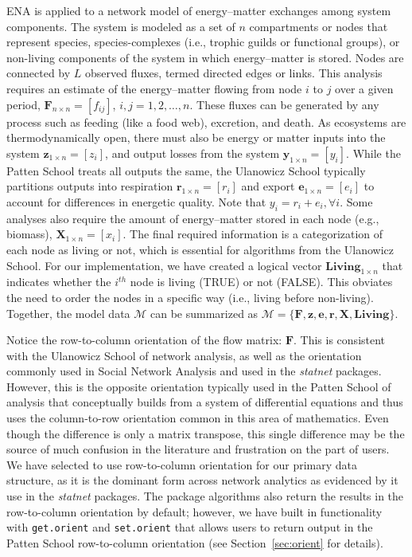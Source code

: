 \documentclass[article]{jss}
\begin{document}
ENA is applied to a network model of energy--matter exchanges among
system components.  The system is modeled as a set of $n$ compartments
or nodes that represent species, species-complexes (i.e., trophic
guilds or functional groups), or non-living components of the system
in which energy--matter is stored.  Nodes are connected by $L$
observed fluxes, termed directed edges or links.  This analysis
requires an estimate of the energy--matter flowing from node $i$ to
$j$ over a given period, $\mathbf{F}_{n\times n}=[f_{ij}]$,
$i,j=1,2,\ldots,n$.  These fluxes can be generated by any process such
as feeding (like a food web), excretion, and death.  As ecosystems are
thermodynamically open, there must also be energy or matter inputs
into the system $\mathbf{z}_{1 \times n}=[z_i]$, and output losses
from the system $\mathbf{y}_{1 \times n}=[y_i]$.  While the Patten
School treats all outputs the same, the Ulanowicz School typically
partitions outputs into respiration $\mathbf{r}_{1\times n}=[r_i]$ and
export $\mathbf{e}_{1\times n}=[e_i]$ to account for differences in
energetic quality. Note that $y_i = r_i + e_i, \forall i$.  Some
analyses also require the amount of energy--matter stored in each node
(e.g., biomass), $\mathbf{X}_{1\times n}=[x_i]$.  The final required
information is a categorization of each node as living or not, which
is essential for algorithms from the Ulanowicz School.  For our
implementation, we have created a logical vector
$\mathbf{Living}_{1 \times n}$ that indicates whether the $i^{th}$
node is living (TRUE) or not (FALSE).  This obviates the need to order
the nodes in a specific way (i.e., living before non-living).
Together, the model data $\mathcal{M}$ can be summarized as
$\mathcal{M} = \{\mathbf{F}, \mathbf{z}, \mathbf{e}, \mathbf{r},
\mathbf{X}, \mathbf{Living}\}$.


Notice the row-to-column orientation of the flow matrix:
$\mathbf{F}$. This is consistent with the Ulanowicz School of network
analysis, as well as the orientation commonly used in Social Network
Analysis and used in the \textit{statnet} packages.  However, this is
the opposite orientation typically used in the Patten School of
analysis that conceptually builds from a system of differential
equations and thus uses the column-to-row orientation common in this
area of mathematics. Even though the difference is only a matrix
transpose, this single difference may be the source of much confusion
in the literature and frustration on the part of users.  We have
selected to use row-to-column orientation for our primary data
structure, as it is the dominant form across network analytics as
evidenced by it use in the \textit{statnet} packages. The package
algorithms also return the results in the row-to-column orientation by
default; however, we have built in functionality with
\texttt{get.orient} and \texttt{set.orient} that allows users to
return output in the Patten School row-to-column orientation (see
Section~\ref{sec:orient} for details).
\end{document}
